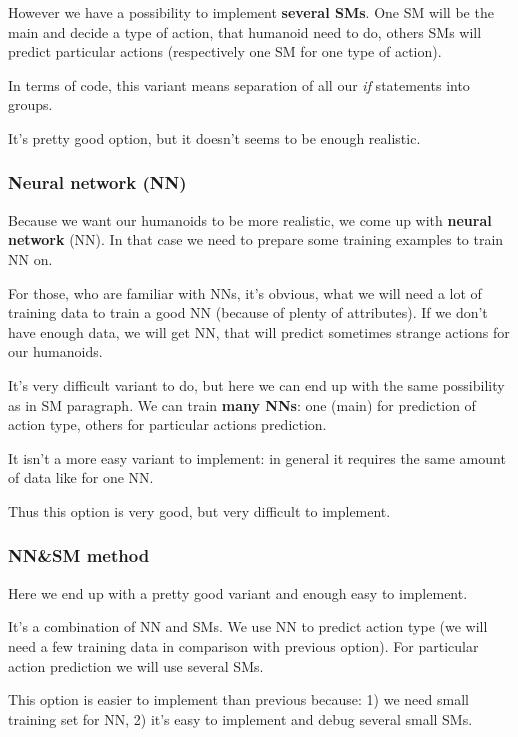 \documentclass[12pt]{article}
\begin{document}
                However we have a possibility to implement \textbf{several SMs}. One SM will be the main and decide a type of action, that humanoid need to do, others SMs will predict particular actions (respectively one SM for one type of action).

                In terms of code, this variant means separation of all our \textit{if} statements into groups.

                It's pretty good option, but it doesn't seems to be enough realistic.

            \subsubsection{Neural network (NN)}
                Because we want our humanoids to be more realistic, we come up with \textbf{neural network} (NN). In that case we need to prepare some training examples to train NN on.

                For those, who are familiar with NNs, it's obvious, what we will need a lot of training data to train a good NN (because of plenty of attributes). If we don't have enough data, we will get NN, that will predict sometimes strange actions for our humanoids.

                It's very difficult variant to do, but here we can end up with the same possibility as in SM paragraph. We can train \textbf{many NNs}: one (main) for prediction of action type, others for particular actions prediction.

                It isn't a more easy variant to implement: in general it requires the same amount of data like for one NN.

                Thus this option is very good, but very difficult to implement.

            \subsubsection{NN\&SM method}
                Here we end up with a pretty good variant and enough easy to implement.

                It's a combination of NN and SMs. We use NN to predict action type (we will need a few training data in comparison with previous option). For particular action prediction we will use several SMs.

                This option is easier to implement than previous because: 1) we need small training set for NN, 2) it's easy to implement and debug several small SMs.
\end{document}
